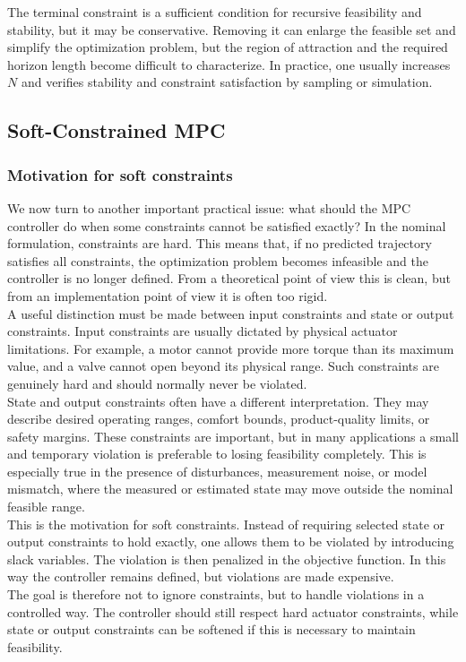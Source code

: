 \begin{theorembox}
The terminal constraint is a sufficient condition for recursive feasibility and stability, but it may
be conservative. Removing it can enlarge the feasible set and simplify the optimization problem,
but the region of attraction and the required horizon length become difficult to characterize.
In practice, one usually increases \(N\) and verifies stability and constraint satisfaction by
sampling or simulation.
\end{theorembox}

\subsection{Soft-Constrained MPC}

\subsubsection{Motivation for soft constraints}

We now turn to another important practical issue: what should the MPC controller do when some
constraints cannot be satisfied exactly? In the nominal formulation, constraints are hard. This
means that, if no predicted trajectory satisfies all constraints, the optimization problem becomes
infeasible and the controller is no longer defined. From a theoretical point of view this is clean,
but from an implementation point of view it is often too rigid.\\
A useful distinction must be made between input constraints and state or output constraints.
Input constraints are usually dictated by physical actuator limitations. For example, a motor
cannot provide more torque than its maximum value, and a valve cannot open beyond its physical
range. Such constraints are genuinely hard and should normally never be violated.\\

State and output constraints often have a different interpretation. They may describe desired
operating ranges, comfort bounds, product-quality limits, or safety margins. These constraints
are important, but in many applications a small and temporary violation is preferable to losing
feasibility completely. This is especially true in the presence of disturbances, measurement noise,
or model mismatch, where the measured or estimated state may move outside the nominal feasible
range.\\
This is the motivation for soft constraints. Instead of requiring selected state or output
constraints to hold exactly, one allows them to be violated by introducing slack variables. The
violation is then penalized in the objective function. In this way the controller remains defined,
but violations are made expensive.\\
The goal is therefore not to ignore constraints, but to handle violations in a controlled way.
The controller should still respect hard actuator constraints, while state or output constraints
can be softened if this is necessary to maintain feasibility.

